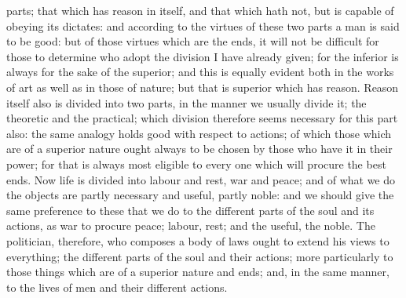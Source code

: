 \documentclass[12pt]{article}
\begin{document}
parts; that which has reason in itself, and that which hath not, but is capable of obeying its dictates: and according to the virtues of these two parts a man is said to be good: but of those virtues which are the ends, it will not be difficult for those to determine who adopt the division I have already given; for the inferior is always for the sake of the superior; and this is equally evident both in the works of art as well as in those of nature; but that is superior which has reason. Reason itself also is divided into two parts, in the manner we usually divide it; the theoretic and the practical; which division therefore seems necessary for this part also: the same analogy holds good with respect to actions; of which those which are of a superior nature ought always to be chosen by those who have it in their power; for that is always most eligible to every one which will procure the best ends. Now life is divided into labour and rest, war and peace; and of what we do the objects are partly necessary and useful, partly noble: and we should give the same preference to these that we do to the different parts of the soul and its actions, as war to procure peace; labour, rest; and the useful, the noble. The politician, therefore, who composes a body of laws ought to extend his views to everything; the different parts of the soul and their actions; more particularly to those things which are of a superior nature and ends; and, in the same manner, to the lives of men and their different actions.
\end{document}
